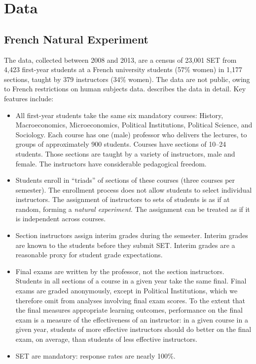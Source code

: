\documentclass[12pt]{article}
\begin{document}
\section{Data}
\subsection{French Natural Experiment}
The data, collected between 2008 and 2013, are a census of 23,001 SET from
4,423 first-year students at a French university students (57\% women) in 1,177
sections, taught by 379 instructors (34\% women). 
The data are not public, owing to French restrictions on human subjects data.
\citet{Boring2015} describes the data in detail.
Key features include:
\begin{itemize}
   \item All first-year students take the same six mandatory courses: 
            History, Macroeconomics, Microeconomics, 
            Political Institutions, Political Science, and Sociology.
            Each course has one (male) professor
            who delivers the lectures, to groups of approximately 900 students. 
            Courses have sections of 10--24 students. 
            Those sections are taught by a variety of instructors, male and female.
            The instructors have considerable pedagogical freedom.
    
   \item Students enroll in ``triads'' of sections of these courses (three courses per semester). 
            The enrollment process does not allow students to select individual instructors.
            The assignment of instructors to sets of students is as if at random,
            forming a \emph{natural experiment}.
            The assignment can be treated as if it is independent across 
            courses.
            
   \item Section instructors assign interim grades during the semester.
            Interim grades are known to the students before they submit SET.
            Interim grades are a reasonable proxy for student grade expectations.
            
   \item Final exams are written by the professor, not the section instructors.
            Students in all sections of a course in a given year take the same final.
            Final exams are graded anonymously, except in Political
            Institutions, which we therefore omit from analyses involving final exam scores.
            To the extent that the final measures appropriate learning outcomes, 
            performance on the final exam is a measure of the effectiveness of
            an instructor: in a given course in a given year,
            students of more effective instructors should do better on
            the final exam, on average, than students of less effective instructors.
    
   \item SET are mandatory: response rates are nearly 100\%.
   
\end{itemize}
\end{document}
